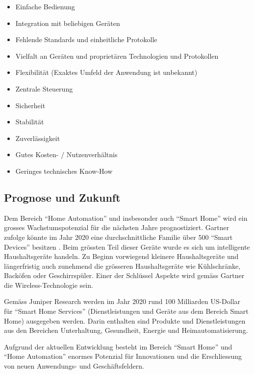 \begin{itemize}
\item Einfache Bedienung
\item Integration mit beliebigen Geräten
\item Fehlende Standards und einheitliche Protokolle
\item Vielfalt an Geräten und proprietären Technologien und Protokollen
\item Flexibilität (Exaktes Umfeld der Anwendung ist unbekannt)
\item Zentrale Steuerung
\item Sicherheit
\item Stabilität
\item Zuverlässigkeit
\item Gutes Kosten- / Nutzenverhältnis
\item Geringes technisches Know-How
\end{itemize}

\subsection{Prognose und Zukunft}
Dem Bereich "`Home Automation"' und insbesonder auch "`Smart Home"' wird ein grosses Wachstumspotenzial für die nächsten Jahre prognostiziert. Gartner zufolge könnte im Jahr 2020 eine durchschnittliche Familie über 500 "`Smart Devices"' besitzen \cite{E:Gartner:Prognose:SmartHome}. Beim grössten Teil dieser Geräte wurde es sich um intelligente Haushaltsgeräte handeln. Zu Beginn vorwiegend kleinere Haushaltsgeräte und längerfristig auch zunehmend die grösseren Haushaltsgeräte wie Kühlschränke, Backöfen oder Geschirrspüler. Einer der Schlüssel Aspekte wird gemäss Gartner die Wireless-Technologie sein.

Gemäss Juniper Research werden im Jahr 2020 rund 100 Milliarden US-Dollar für "`Smart Home Services"' (Dienstleistungen und Geräte aus dem Bereich Smart Home) ausgegeben werden. Darin enthalten sind Produkte und Dienstleistungen aus den Bereichen Unterhaltung, Gesundheit, Energie und Heimautomatisierung.

Aufgrund der aktuellen Entwicklung besteht im Bereich "`Smart Home"' und "`Home Automation"' enormes Potenzial für Innovationen und die Erschliessung von neuen Anwendungs- und Geschäftsfeldern. 


